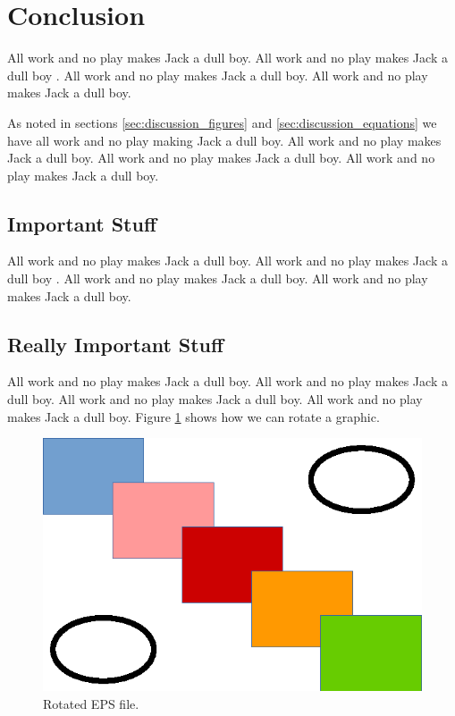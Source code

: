 
%
%

%
%

\section{Conclusion}
\label{sec:conclusion}

All work and no play makes Jack a dull boy.
All work and no play makes Jack a dull boy \cite{knuth-website}.
All work and no play makes Jack a dull boy.
All work and no play makes Jack a dull boy.

As noted in sections
\ref{sec:discussion_figures} and
\ref{sec:discussion_equations}
we have all work and no play making Jack a dull boy.
All work and no play makes Jack a dull boy.
All work and no play makes Jack a dull boy.
All work and no play makes Jack a dull boy.

\subsection{Important Stuff}
\label{sec:conclusions_important_stuff}

All work and no play makes Jack a dull boy.
All work and no play makes Jack a dull boy
\cite{einstein-electrodynamics,
knuth-website,
knuth-fundamental-algorithms,
dirac-quantum-mechanics}.
All work and no play makes Jack a dull boy.
All work and no play makes Jack a dull boy.

\subsection{Really Important Stuff}
\label{sec:conclusions_really_important_stuff}

All work and no play makes Jack a dull boy.
All work and no play makes Jack a dull boy.
All work and no play makes Jack a dull boy.
All work and no play makes Jack a dull boy.
Figure \ref{fig:rotated_shapes} shows how we can rotate a graphic.

\begin{figure}[ht]
\centering
\includegraphics[width=\linewidth, angle =90]{../figures/shapes.eps}
\caption{Rotated EPS file.}
\label{fig:rotated_shapes}
\end{figure}
